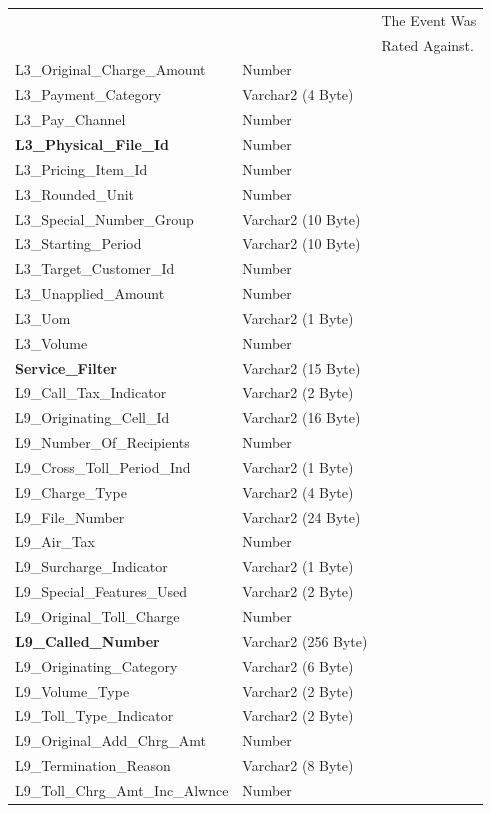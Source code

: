 \documentclass[12pt,twoside]{article}
\begin{document}
\begin{longtable}{l|l|l}
 &  & The Event Was\\
 &  & Rated Against.\\
L3\_Original\_Charge\_Amount & Number & \\
L3\_Payment\_Category & Varchar2 (4 Byte) & \\
L3\_Pay\_Channel & Number & \\
\textbf{L3\_Physical\_File\_Id} & Number & \\
L3\_Pricing\_Item\_Id & Number & \\
L3\_Rounded\_Unit & Number & \\
L3\_Special\_Number\_Group & Varchar2 (10 Byte) & \\
L3\_Starting\_Period & Varchar2 (10 Byte) & \\
L3\_Target\_Customer\_Id & Number & \\
L3\_Unapplied\_Amount & Number & \\
L3\_Uom & Varchar2 (1 Byte) & \\
L3\_Volume & Number & \\
\textbf{Service\_Filter} & Varchar2 (15 Byte) & \\
L9\_Call\_Tax\_Indicator & Varchar2 (2 Byte) & \\
L9\_Originating\_Cell\_Id & Varchar2 (16 Byte) & \\
L9\_Number\_Of\_Recipients & Number & \\
L9\_Cross\_Toll\_Period\_Ind & Varchar2 (1 Byte) & \\
L9\_Charge\_Type & Varchar2 (4 Byte) & \\
L9\_File\_Number & Varchar2 (24 Byte) & \\
L9\_Air\_Tax & Number & \\
L9\_Surcharge\_Indicator & Varchar2 (1 Byte) & \\
L9\_Special\_Features\_Used & Varchar2 (2 Byte) & \\
L9\_Original\_Toll\_Charge & Number & \\
\textbf{L9\_Called\_Number} & Varchar2 (256 Byte) & \\
L9\_Originating\_Category & Varchar2 (6 Byte) & \\
L9\_Volume\_Type & Varchar2 (2 Byte) & \\
L9\_Toll\_Type\_Indicator & Varchar2 (2 Byte) & \\
L9\_Original\_Add\_Chrg\_Amt & Number & \\
L9\_Termination\_Reason & Varchar2 (8 Byte) & \\
L9\_Toll\_Chrg\_Amt\_Inc\_Alwnce & Number & \\

\end{longtable}
\end{document}
